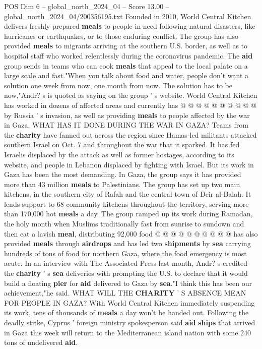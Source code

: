\begin{textsample}{POS Dim 6 – global\_north\_2024\_04 – Score 13.00 – global\_north\_2024\_04/200356195.txt}
Founded in 2010, World Central Kitchen delivers freshly prepared \textbf{meals} to people in need following natural disasters, like hurricanes or earthquakes, or to those enduring conflict.
The group has also provided \textbf{meals} to migrants arriving at the southern U.S. border, as well as to hospital staff who worked relentlessly during the coronavirus pandemic.
The \textbf{aid} group sends in teams who can cook \textbf{meals} that appeal to the local palate on a large scale and fast."When you talk about food and water, people don't want a solution one week from now, one month from now.
The solution has to be now,"Andr? s is quoted as saying on the group ' s website.
World Central Kitchen has worked in dozens of affected areas and currently has @ @ @ @ @ @ @ @ @ @ by Russia ' s invasion, as well as providing \textbf{meals} to people affected by the war in Gaza.
WHAT HAS IT DONE DURING THE WAR IN GAZA?
Teams from the \textbf{charity} have fanned out across the region since Hamas-led militants attacked southern Israel on Oct. 7 and throughout the war that it sparked.
It has fed Israelis displaced by the attack as well as former hostages, according to its website, and people in Lebanon displaced by fighting with Israel.
But its work in Gaza has been the most demanding.
In Gaza, the group says it has provided more than 43 million \textbf{meals} to Palestinians.
The group has set up two main kitchens, in the southern city of Rafah and the central town of Deir al-Balah.
It lends support to 68 community kitchens throughout the territory, serving more than 170,000 hot \textbf{meals} a day.
The group ramped up its work during Ramadan, the holy month when Muslims traditionally fast from sunrise to sundown and then eat a lavish \textbf{meal}, distributing 92,000 food @ @ @ @ @ @ @ @ @ @ has also provided \textbf{meals} through \textbf{airdrops} and has led two \textbf{shipments} by \textbf{sea} carrying hundreds of tons of food for northern Gaza, where the food emergency is most acute.
In an interview with The Associated Press last month, Andr? s credited the \textbf{charity} ' s \textbf{sea} deliveries with prompting the U.S. to declare that it would build a floating \textbf{pier} for \textbf{aid} delivered to Gaza by \textbf{sea}."I think this has been our achievement,"he said.
WHAT WILL THE \textbf{CHARITY} ' S ABSENCE MEAN FOR PEOPLE IN GAZA?
With World Central Kitchen immediately suspending its work, tens of thousands of \textbf{meals} a day won't be handed out.
Following the deadly strike, Cyprus ' foreign ministry spokesperson said \textbf{aid} \textbf{ships} that arrived in Gaza this week will return to the Mediterranean island nation with some 240 tons of undelivered \textbf{aid}.

\end{textsample}
